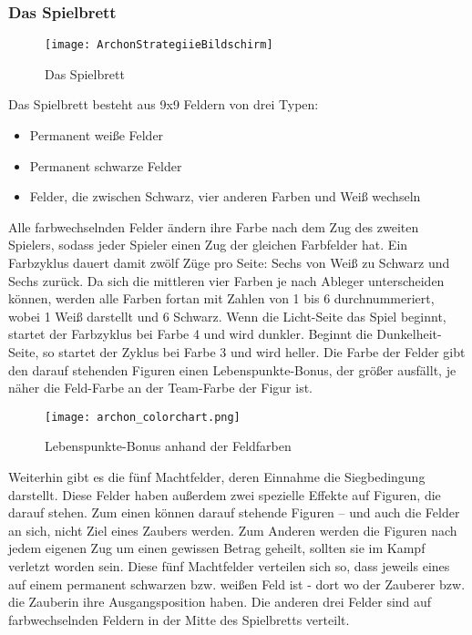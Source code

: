 \subsubsection{Das Spielbrett}
\begin{figure}[htp]
	\centering
	\captionsetup{justification=centering}
	\texttt{[image: ArchonStrategiieBildschirm]}
	\caption[Das Spielbrett]{Das Spielbrett \footnotemark}
	\label{fig:StrategyBoard}
\end{figure}
Das Spielbrett besteht aus 9x9 Feldern von drei Typen: 
\begin{itemize}
	\item Permanent weiße Felder
	\item Permanent schwarze Felder
	\item Felder, die zwischen Schwarz, vier anderen Farben und Weiß wechseln
\end{itemize}
Alle farbwechselnden Felder ändern ihre Farbe nach dem Zug des zweiten Spielers, sodass jeder Spieler einen Zug der gleichen Farbfelder hat. Ein Farbzyklus dauert damit zwölf Züge pro Seite: Sechs von Weiß zu Schwarz und Sechs zurück.
Da sich die mittleren vier Farben je nach Ableger unterscheiden können, werden alle Farben fortan mit Zahlen von 1 bis 6 durchnummeriert, wobei 1 Weiß darstellt und 6 Schwarz.
Wenn die Licht-Seite das Spiel beginnt, startet der Farbzyklus bei Farbe 4 und wird dunkler. Beginnt die Dunkelheit-Seite, so startet der Zyklus bei Farbe 3 und wird heller. Die Farbe der Felder gibt den darauf stehenden Figuren einen Lebenspunkte-Bonus, der größer ausfällt, je näher die Feld-Farbe an der Team-Farbe der Figur ist.

\begin{figure}[htp]
	\centering
	\captionsetup{justification=centering}
	\texttt{[image: archon\_colorchart.png]}
	\caption[Lebenspunkte-Bonus]{Lebenspunkte-Bonus anhand der Feldfarben\footnotemark}
	\label{fig:HP-Bonus}
\end{figure}

\noindent Weiterhin gibt es die fünf Machtfelder, deren Einnahme die Siegbedingung darstellt. Diese Felder haben außerdem zwei spezielle Effekte auf Figuren, die darauf stehen. Zum einen können darauf stehende Figuren -- und auch die Felder an sich, nicht Ziel eines Zaubers werden. Zum Anderen werden die Figuren nach jedem eigenen Zug um einen gewissen Betrag geheilt, sollten sie im Kampf verletzt worden sein. Diese fünf Machtfelder verteilen sich so, dass jeweils eines auf einem permanent schwarzen bzw. weißen Feld ist - dort wo der Zauberer bzw. die Zauberin ihre Ausgangsposition haben. Die anderen drei Felder sind auf farbwechselnden Feldern in der Mitte des Spielbretts verteilt.

